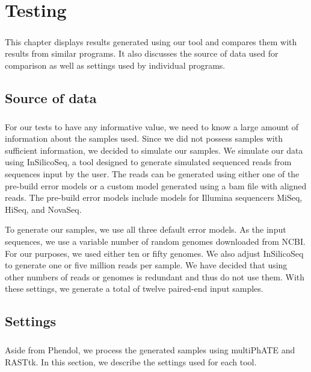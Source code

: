 \chapter{Testing}

\label{kap:testing} %
\paragraph*{}
This chapter displays results generated using our tool and compares them with results from similar programs. It also discusses the source of data used for comparison as well as settings used by individual programs.

\section{Source of data}
\paragraph*{}
For our tests to have any informative value, we need to know a large amount of information about the samples used. Since we did not possess samples with sufficient information, we decided to simulate our samples. We simulate our data using InSilicoSeq, a tool designed to generate simulated sequenced reads from sequences input by the user. The reads can be generated using either one of the pre-build error models or a custom model generated using a bam file with aligned reads. The pre-build error models include models for Illumina sequencers MiSeq, HiSeq, and NovaSeq.

To generate our samples, we use all three default error models. As the input sequences, we use a variable number of random genomes downloaded from NCBI. For our purposes, we used either ten or fifty genomes. We also adjust InSilicoSeq to generate one or five million reads per sample. We have decided that using other numbers of reads or genomes is redundant and thus do not use them. With these settings, we generate a total of twelve paired-end input samples.

\section{Settings}
\paragraph*{}
Aside from Phendol, we process the generated samples using multiPhATE and RASTtk. In this section, we describe the settings used for each tool.

